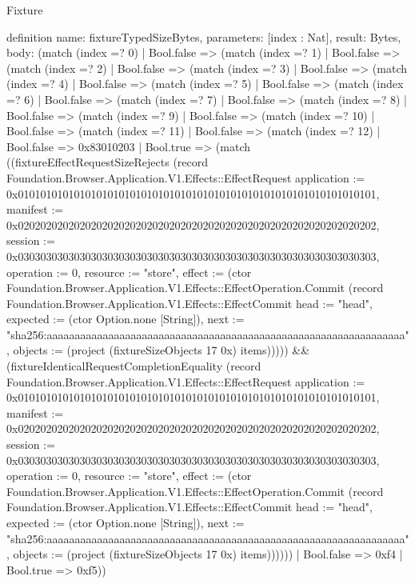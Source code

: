 \begin{lexlean}{Fixture}
\begin{semanticmodule}
definition{
  name: fixtureTypedSizeBytes,
  parameters: [index : Nat],
  result: Bytes,
  body: (match (index =? 0)
    | Bool.false => (match (index =? 1)
      | Bool.false => (match (index =? 2)
        | Bool.false => (match (index =? 3)
          | Bool.false => (match (index =? 4)
            | Bool.false => (match (index =? 5)
              | Bool.false => (match (index =? 6)
                | Bool.false => (match (index =? 7)
                  | Bool.false => (match (index =? 8)
                    | Bool.false => (match (index =? 9)
                      | Bool.false => (match (index =? 10)
                        | Bool.false => (match (index =? 11)
                          | Bool.false => (match (index =? 12)
                            | Bool.false => 0x83010203
                            | Bool.true => (match ((fixtureEffectRequestSizeRejects (record Foundation.Browser.Application.V1.Effects::EffectRequest {application := 0x0101010101010101010101010101010101010101010101010101010101010101, manifest := 0x0202020202020202020202020202020202020202020202020202020202020202, session := 0x0303030303030303030303030303030303030303030303030303030303030303, operation := 0, resource := "store", effect := (ctor Foundation.Browser.Application.V1.Effects::EffectOperation.Commit (record Foundation.Browser.Application.V1.Effects::EffectCommit {head := "head", expected := (ctor Option.none [String]), next := "sha256:aaaaaaaaaaaaaaaaaaaaaaaaaaaaaaaaaaaaaaaaaaaaaaaaaaaaaaaaaaaaaaaa", objects := (project (fixtureSizeObjects 17 0x) items)}))})) && (fixtureIdenticalRequestCompletionEquality (record Foundation.Browser.Application.V1.Effects::EffectRequest {application := 0x0101010101010101010101010101010101010101010101010101010101010101, manifest := 0x0202020202020202020202020202020202020202020202020202020202020202, session := 0x0303030303030303030303030303030303030303030303030303030303030303, operation := 0, resource := "store", effect := (ctor Foundation.Browser.Application.V1.Effects::EffectOperation.Commit (record Foundation.Browser.Application.V1.Effects::EffectCommit {head := "head", expected := (ctor Option.none [String]), next := "sha256:aaaaaaaaaaaaaaaaaaaaaaaaaaaaaaaaaaaaaaaaaaaaaaaaaaaaaaaaaaaaaaaa", objects := (project (fixtureSizeObjects 17 0x) items)}))})))
                              | Bool.false => 0xf4
                              | Bool.true => 0xf5))
}
\end{semanticmodule}
\end{lexlean}
